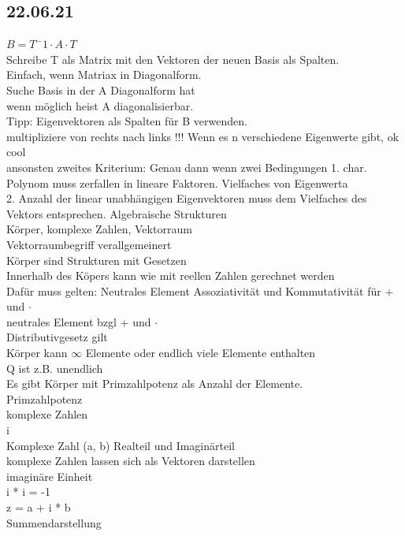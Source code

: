 \documentclass{article}
\begin{document}
	\subsection*{22.06.21}
	$B = T^-1 \cdot A \cdot T$ \\
	Schreibe T als Matrix mit den Vektoren der neuen Basis als Spalten. \\
	Einfach, wenn Matriax in Diagonalform. \\
	Suche Basis in der  A Diagonalform hat \\
	wenn möglich heist A diagonalisierbar. \\
	Tipp: Eigenvektoren als Spalten für B verwenden. \\
	multipliziere von rechts nach links !!!
	Wenn es n verschiedene Eigenwerte gibt, ok cool \\
	ansonsten zweites Kriterium: Genau dann wenn zwei Bedingungen 1. char. Polynom muss zerfallen in lineare Faktoren. Vielfaches von Eigenwerta \\
	2. Anzahl der linear unabhängigen Eigenvektoren muss dem Vielfaches des Vektors entsprechen.
	Algebraische Strukturen \\
	Körper, komplexe Zahlen, Vektorraum \\
	Vektorraumbegriff verallgemeinert \\
	Körper sind Strukturen mit Gesetzen \\
	Innerhalb des Köpers kann wie mit reellen Zahlen gerechnet werden \\
	Dafür muss gelten: Neutrales Element Assoziativität und Kommutativität für + und $\cdot$ \\
	neutrales Element bzgl + und $\cdot$ \\
	Distributivgesetz gilt \\
	Körper kann $\infty$ Elemente oder endlich viele Elemente enthalten \\
	Q ist z.B. unendlich \\
	Es gibt Körper mit Primzahlpotenz als Anzahl der Elemente. \\
	Primzahlpotenz \\
	komplexe Zahlen \\
	i \\
	Komplexe Zahl (a, b) Realteil und Imaginärteil \\
	komplexe Zahlen lassen sich als Vektoren darstellen \\
	imaginäre Einheit \\
	i * i = -1 \\
	z = a + i * b \\
	Summendarstellung
\end{document}
